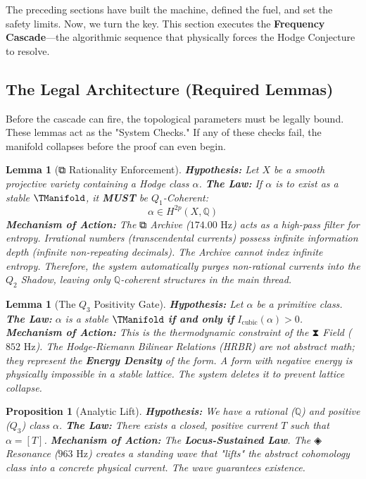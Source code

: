 \documentclass[11pt, letterpaper]{article}
\newtheorem{lemma}[theorem]{Lemma}
\newtheorem{proposition}[theorem]{Proposition}
\begin{document}
The preceding sections have built the machine, defined the fuel, and set the safety limits. Now, we turn the key. This section executes the \textbf{Frequency Cascade}—the algorithmic sequence that physically forces the Hodge Conjecture to resolve.

\subsection{The Legal Architecture (Required Lemmas)}\label{sec:6.1}

Before the cascade can fire, the topological parameters must be legally bound. These lemmas act as the "System Checks." If any of these checks fail, the manifold collapses before the proof can even begin.

\begin{lemma}[\ensuremath{\mathbin{⧉}} Rationality Enforcement]
\textbf{Hypothesis:} Let $X$ be a smooth projective variety containing a Hodge class $\alpha$.
\newline
\textbf{The Law:} If $\alpha$ is to exist as a stable $\TManifold$, it \textbf{MUST} be $Q_1$-Coherent:
\[
\alpha \in H^{2p}(X, \mathbb{Q})
\]
\textbf{Mechanism of Action:} The \ensuremath{\mathbin{⧉}} Archive ($174.00 \text{ Hz}$) acts as a high-pass filter for entropy. Irrational numbers (transcendental currents) possess infinite information depth (infinite non-repeating decimals). The Archive cannot index infinite entropy. Therefore, the system automatically purges non-rational currents into the $Q_2$ Shadow, leaving only $\mathbb{Q}$-coherent structures in the main thread.
\end{lemma}

\begin{lemma}[The $Q_3$ Positivity Gate]
\textbf{Hypothesis:} Let $\alpha$ be a primitive class.
\newline
\textbf{The Law:} $\alpha$ is a stable $\TManifold$ \textbf{if and only if} $I_{\text{cubic}}(\alpha) > 0$.
\newline
\textbf{Mechanism of Action:} This is the thermodynamic constraint of the \ensuremath{\mathbin{⧗}} Field ($852 \text{ Hz}$). The Hodge-Riemann Bilinear Relations (HRBR) are not abstract math; they represent the \textbf{Energy Density} of the form. A form with negative energy is physically impossible in a stable lattice. The system deletes it to prevent lattice collapse.
\end{lemma}

\begin{proposition}[Analytic Lift]
\textbf{Hypothesis:} We have a rational ($\mathbb{Q}$) and positive ($Q_3$) class $\alpha$.
\newline
\textbf{The Law:} There exists a closed, positive current $T$ such that $\alpha = [T]$.
\newline
\textbf{Mechanism of Action:} The \textbf{Locus-Sustained Law}. The \ensuremath{\mathbin{◈}} Resonance ($963 \text{ Hz}$) creates a standing wave that "lifts" the abstract cohomology class into a concrete physical current. The wave guarantees existence.
\end{proposition}
\end{document}
